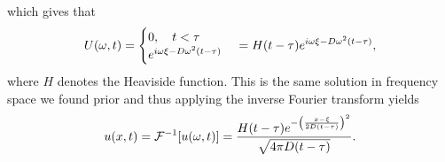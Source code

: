 \documentclass[12pt]{report}
\begin{document}
\begin{solution}
\begin{enumerate}
\[        \] 
        which gives that
        \[ 
            U({\omega},t) = \begin{cases}
                0, \quad t < {\tau}\\
                e^{i{\omega}{\xi} - D{\omega}^2(t - {\tau})}
            \end{cases} = H(t - {\tau})e^{i{\omega}{\xi} - D{\omega}^2(t - {\tau})},
        \]
        where $H$ denotes the Heaviside function. This is the same solution in frequency space we found prior and thus applying the inverse Fourier transform yields
        \[ 
            u(x,t) = {\mathcal{F}}^{-1}[u({\omega},t)] = \frac{H(t - \tau)e^{-{\left(\frac{x-{\xi}}{2D(t- {\tau})}\right)}^2}}{\sqrt{4\pi D(t - {\tau})}}.
        \]

    \end{enumerate}

\end{solution}

\newpage
\end{document}
